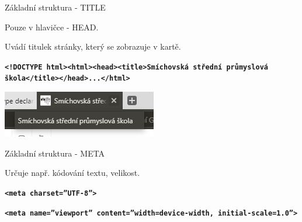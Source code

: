 \documentclass[aspectratio=1610]{beamer}
\begin{document}
\begin{frame}{Základní struktura - TITLE}
    \begin{cardTiny}
        \begin{flushleft}
            Pouze v hlavičce - HEAD.

            Uvádí titulek stránky, který se zobrazuje v kartě.
        \end{flushleft}
    \end{cardTiny}
    \begin{cardTiny}
        \begin{flushleft}
        \texttt{\textbf{<!DOCTYPE html><html><head><title>Smíchovská střední průmyslová škola</title></head>...</html>}}
        \end{flushleft}
    \end{cardTiny}
\end{frame}

\begin{frame}
    \begin{center}
        \includegraphics[width=\textwidth]{img/tab-ssps.png}
    \end{center}
\end{frame}

\begin{frame}{Základní struktura - META}
    \begin{cardTiny}
        \begin{flushleft}
        Určuje např. kódování textu, velikost.
        \end{flushleft}
    \end{cardTiny}
    \begin{cardTiny}
        \begin{flushleft}
        \texttt{\textbf{<meta charset=''UTF-8''>}}
        
        \texttt{\textbf{<meta name=''viewport'' content=''width=device-width, initial-scale=1.0''>}}
        \end{flushleft}
    \end{cardTiny}
\end{frame}
\end{document}
